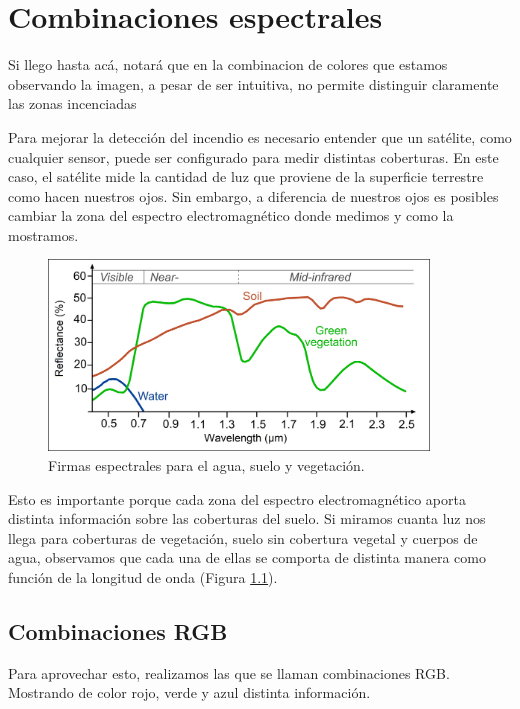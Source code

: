 \documentclass[a4paper,12pt]{book}
\begin{document}
\chapter{Combinaciones espectrales}
Si llego hasta acá, notará que en la combinacion de colores que estamos observando la imagen, a pesar de ser intuitiva, no permite distinguir claramente las zonas incenciadas

Para mejorar la detección del incendio es necesario entender que un satélite, como cualquier sensor, puede ser configurado para medir distintas coberturas. En este caso, el satélite mide la cantidad de luz que proviene de la superficie terrestre como hacen nuestros ojos. Sin embargo, a diferencia de nuestros ojos es posibles cambiar la zona del espectro electromagnético donde medimos y como la mostramos.

\begin{figure}[h!]
    \centering
    \includegraphics[width=0.9\textwidth]{fig:spec.jpg}
    \caption{Firmas espectrales para el agua, suelo y vegetación.}
    \label{fig:spec}
\end{figure}

Esto es importante porque cada zona del espectro electromagnético aporta distinta información sobre las coberturas del suelo. Si miramos cuanta luz nos llega para coberturas de vegetación, suelo sin cobertura vegetal y cuerpos de agua, observamos que cada una de ellas se comporta de distinta manera como función de la longitud de onda (Figura \ref{fig:spec}).

\section{Combinaciones RGB}

Para aprovechar esto, realizamos las que se llaman combinaciones RGB. Mostrando de color rojo, verde y azul distinta información.
\end{document}
